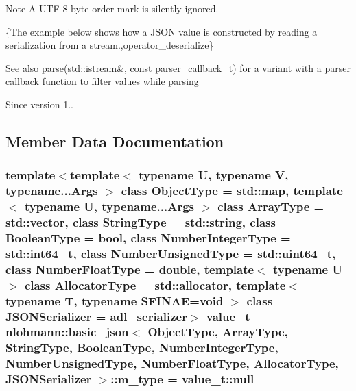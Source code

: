 \begin{DoxyNote}{Note}
A U\+T\+F-\/8 byte order mark is silently ignored.
\end{DoxyNote}
\{The example below shows how a J\+S\+ON value is constructed by reading a serialization from a stream.,operator\+\_\+deserialize\}

\begin{DoxySeeAlso}{See also}
parse(std\+::istream\&, const parser\+\_\+callback\+\_\+t) for a variant with a \hyperlink{classnlohmann_1_1basic__json_aba9704e82d18f8954f9925e26cec7a51}{parser} callback function to filter values while parsing
\end{DoxySeeAlso}
\begin{DoxySince}{Since}
version 1.. 
\end{DoxySince}


\subsection{Member Data Documentation}
\subsubsection[{\texorpdfstring{m\+\_\+type}{m_type}}]{\setlength{\rightskip}{0pt plus 5cm}template$<$template$<$ typename U, typename V, typename...\+Args $>$ class Object\+Type = std\+::map, template$<$ typename U, typename...\+Args $>$ class Array\+Type = std\+::vector, class String\+Type  = std\+::string, class Boolean\+Type  = bool, class Number\+Integer\+Type  = std\+::int64\+\_\+t, class Number\+Unsigned\+Type  = std\+::uint64\+\_\+t, class Number\+Float\+Type  = double, template$<$ typename U $>$ class Allocator\+Type = std\+::allocator, template$<$ typename T, typename S\+F\+I\+N\+A\+E=void $>$ class J\+S\+O\+N\+Serializer = adl\+\_\+serializer$>$ {\bf value\+\_\+t} {\bf nlohmann\+::basic\+\_\+json}$<$ Object\+Type, Array\+Type, String\+Type, Boolean\+Type, Number\+Integer\+Type, Number\+Unsigned\+Type, Number\+Float\+Type, Allocator\+Type, J\+S\+O\+N\+Serializer $>$\+::m\+\_\+type = {\bf value\+\_\+t\+::null}\hspace{0.3cm}{\ttfamily [private]}}\hypertarget{classnlohmann_1_1basic__json_a91990b60d7d4d67968a2c1db677536e7}{}\label{classnlohmann_1_1basic__json_a91990b60d7d4d67968a2c1db677536e7}


